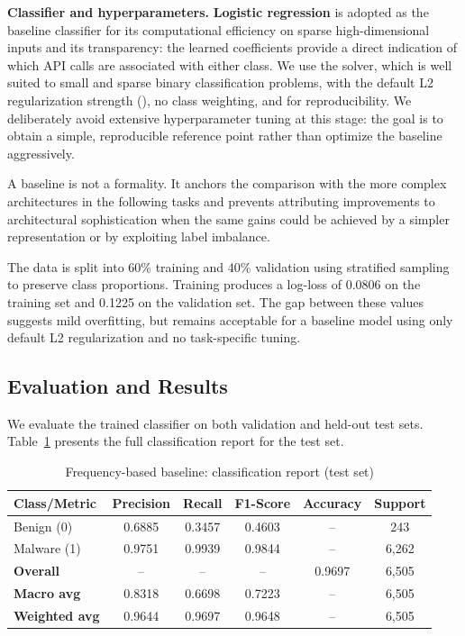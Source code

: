 \textbf{Classifier and hyperparameters.} \textbf{Logistic regression} is adopted as the baseline classifier for its computational efficiency on sparse high-dimensional inputs and its transparency: the learned coefficients provide a direct indication of which API calls are associated with either class. We use the  solver, which is well suited to small and sparse binary classification problems, with the default L2 regularization strength (), no class weighting, and  for reproducibility. We deliberately avoid extensive hyperparameter tuning at this stage: the goal is to obtain a simple, reproducible reference point rather than optimize the baseline aggressively.

A baseline is not a formality. It anchors the comparison with the more complex architectures in the following tasks and prevents attributing improvements to architectural sophistication when the same gains could be achieved by a simpler representation or by exploiting label imbalance.

The data is split into 60\% training and 40\% validation using stratified sampling to preserve class proportions. Training produces a log-loss of 0.0806 on the training set and 0.1225 on the validation set. The gap between these values suggests mild overfitting, but remains acceptable for a baseline model using only default L2 regularization and no task-specific tuning.

\subsection{Evaluation and Results} \label{subsec:task1_results}

We evaluate the trained classifier on both validation and held-out test sets. Table~\ref{tab:task1_results} presents the full classification report for the test set.

\begin{table}[h]
\centering
\caption{Frequency-based baseline: classification report (test set)}
\label{tab:task1_results}
\small
\begin{tabular}{lccccc}
\toprule
\textbf{Class/Metric} & \textbf{Precision} & \textbf{Recall} & \textbf{F1-Score} & \textbf{Accuracy} & \textbf{Support} \\
\midrule
Benign (0) & 0.6885 & 0.3457 & 0.4603 & -- & 243 \\
Malware (1) & 0.9751 & 0.9939 & 0.9844 & -- & 6,262 \\
\midrule
\textbf{Overall} & -- & -- & -- & 0.9697 & 6,505 \\
\textbf{Macro avg} & 0.8318 & 0.6698 & 0.7223 & -- & 6,505 \\
\textbf{Weighted avg} & 0.9644 & 0.9697 & 0.9648 & -- & 6,505 \\
\bottomrule
\end{tabular}
\end{table}

